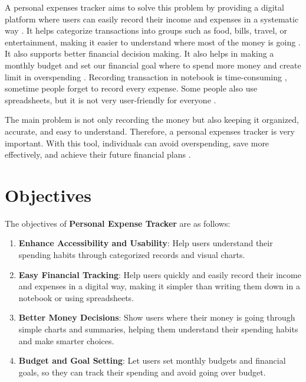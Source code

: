 \documentclass[12pt]{report} %
\begin{document}
A personal expenses tracker aims to solve this problem by providing a digital platform where
users can easily record their income and expenses in a systematic way \cite{chandini2019online}.
It helps categorize transactions into groups such as food, bills, travel, or entertainment, making it
easier to understand where most of the money is going \cite{verma2024research}. It also supports better financial decision making. It also helps in making a monthly budget and set our financial goal where to spend more money
and create limit in overspending \cite{verma2024research}. Recording transaction in notebook is time-consuming ,
sometime people forget to record every expense. Some people also use spreadsheets, but it is
not very user-friendly for everyone \cite{manchanda2017expense}.

The main problem is not only recording the money but also keeping it organized, accurate, and
easy to understand. Therefore, a personal expenses tracker is very important. With this tool,
individuals can avoid overspending, save more effectively, and achieve their future financial
plans \cite{verma2024research}. \vspace{30pt}

\newpage

\chapter{Objectives}
The objectives of \textbf{Personal Expense Tracker} are as follows:

\begin{enumerate}[label=\textbullet, topsep=2pt, partopsep=0pt, itemsep=2pt, parsep=0pt]
   \item \textbf{Enhance Accessibility and Usability}:
    Help users understand their spending habits through categorized records and visual charts.
    \item \textbf{Easy Financial Tracking}:
    Help users quickly and easily record their income and expenses in a digital way, making it simpler than writing them down in a notebook or using spreadsheets.
    \item \textbf{Better Money Decisions}: 
    Show users where their money is going through simple charts and summaries, helping them understand their spending habits and make smarter choices.
    \item \textbf{Budget and Goal Setting}:
    Let users set monthly budgets and financial goals, so they can track their spending and avoid going over budget.
\end{enumerate}
\end{document}
